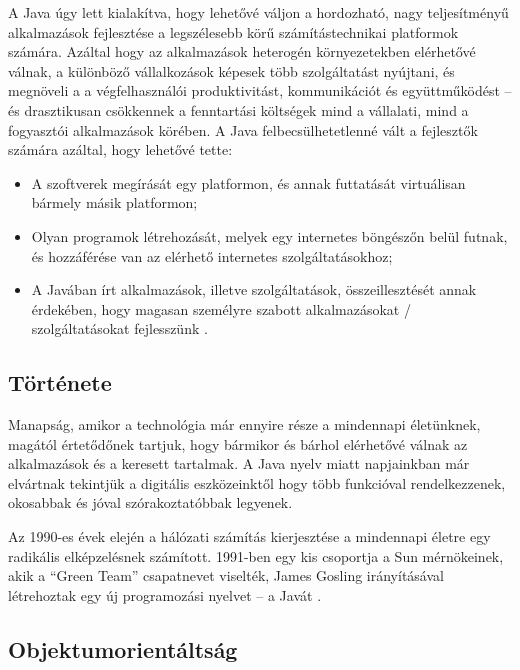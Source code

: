 \documentclass[a4paper,12pt]{report}
\begin{document}
\vspace{2mm}
A Java úgy lett kialakítva, hogy lehetővé váljon a hordozható, nagy teljesítményű alkalmazások fejlesztése a legszélesebb körű számítástechnikai platformok számára. Azáltal hogy az alkalmazások heterogén környezetekben elérhetővé válnak, a különböző vállalkozások képesek több szolgáltatást nyújtani, és megnöveli a a végfelhasználói produktivitást, kommunikációt és együttműködést -- és drasztikusan csökkennek a fenntartási költségek mind a vállalati, mind a fogyasztói alkalmazások körében. A Java felbecsülhetetlenné vált a fejlesztők számára azáltal, hogy lehetővé tette:

\begin{itemize}
\item A szoftverek megírását egy platformon, és annak futtatását virtuálisan bármely másik platformon;
\item Olyan programok létrehozását, melyek egy internetes böngészőn belül futnak, és hozzáférése van az elérhető internetes szolgáltatásokhoz;
\item A Javában írt alkalmazások, illetve szolgáltatások, összeillesztését annak érdekében, hogy magasan személyre szabott alkalmazásokat / szolgáltatásokat fejlesszünk \cite{aboutjava}.
\end{itemize}




\subsection{Története}
\label{javahistory}

Manapság, amikor a technológia már ennyire része a mindennapi életünknek, magától értetődőnek tartjuk, hogy bármikor és bárhol elérhetővé válnak az alkalmazások és a keresett tartalmak. A Java nyelv miatt napjainkban már elvártnak tekintjük a digitális eszközeinktől hogy több funkcióval rendelkezzenek, okosabbak és jóval szórakoztatóbbak legyenek.

\vspace{2mm}
Az 1990-es évek elején a hálózati számítás kierjesztése a mindennapi életre egy radikális elképzelésnek számított. 1991-ben egy kis csoportja a Sun mérnökeinek, akik a ``Green Team'' csapatnevet viselték, James Gosling irányításával létrehoztak egy új programozási nyelvet -- a Javát \cite{javahistory}.

\subsection{Objektumorientáltság}
\label{oo}
\end{document}
